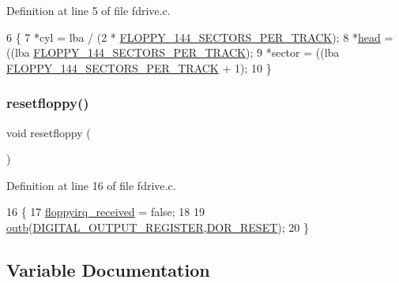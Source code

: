 Definition at line 5 of file fdrive.\+c.


\begin{DoxyCode}
6 \{
7     *cyl    = lba / (2 * \hyperlink{a00029_a04d40064bde801f12fb73134cf328150_a04d40064bde801f12fb73134cf328150}{FLOPPY\_144\_SECTORS\_PER\_TRACK});
8     *\hyperlink{a00167_ac630e1c7e5feeaaf43837648134a0c6d_ac630e1c7e5feeaaf43837648134a0c6d}{head}   = ((lba %
      \hyperlink{a00029_a04d40064bde801f12fb73134cf328150_a04d40064bde801f12fb73134cf328150}{FLOPPY\_144\_SECTORS\_PER\_TRACK});
9     *sector = ((lba %
      \hyperlink{a00029_a04d40064bde801f12fb73134cf328150_a04d40064bde801f12fb73134cf328150}{FLOPPY\_144\_SECTORS\_PER\_TRACK} + 1);
10 \}
\end{DoxyCode}
\mbox{\label{a00029_ad64d38a767bc5f30a3e13a5b01b9cf35_ad64d38a767bc5f30a3e13a5b01b9cf35}} 
\subsubsection{\texorpdfstring{resetfloppy()}{resetfloppy()}}
{\footnotesize\ttfamily void resetfloppy (\begin{DoxyParamCaption}{ }\end{DoxyParamCaption})}



Definition at line 16 of file fdrive.\+c.


\begin{DoxyCode}
16                    \{
17     \hyperlink{a00029_a2cfa75d25a7da8cb54551c7840e80d40_a2cfa75d25a7da8cb54551c7840e80d40}{floppyirq\_received} = \textcolor{keyword}{false};
18 
19     \hyperlink{a00164_aa37f5841c54156a4b14fc0d6f626b44f_aa37f5841c54156a4b14fc0d6f626b44f}{outb}(\hyperlink{a00029_a203a664e6f1b58c27efb4db8ff9db144_a203a664e6f1b58c27efb4db8ff9db144a9767b7f5f447d5346411d03077fea82a}{DIGITAL\_OUTPUT\_REGISTER},\hyperlink{a00029_a6ef9f5776b2d959e47c6c42111900071_a6ef9f5776b2d959e47c6c42111900071}{DOR\_RESET});
20 \}
\end{DoxyCode}


\subsection{Variable Documentation}
\mbox{\label{a00029_a2cfa75d25a7da8cb54551c7840e80d40_a2cfa75d25a7da8cb54551c7840e80d40}} 
